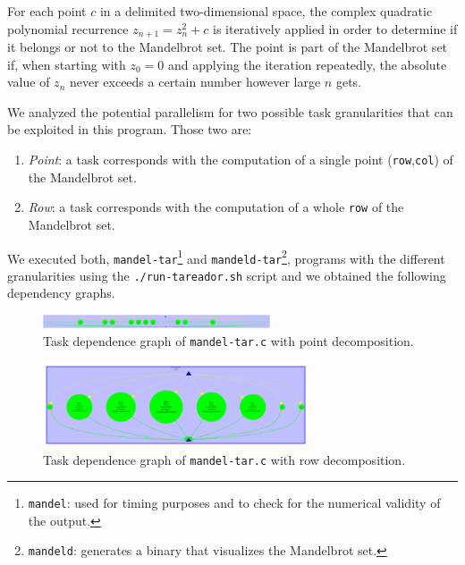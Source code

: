 For each point $c$ in a delimited two-dimensional space, the complex quadratic polynomial recurrence $z_{n+1} = z^2_n + c$ is iteratively applied in order to determine if it belongs or not to the Mandelbrot set.  The point is part of the Mandelbrot set if, when starting with $z_0 = 0$ and applying the iteration repeatedly, the absolute value of $z_n$ never exceeds a certain number however large $n$ gets.

We analyzed the potential parallelism for two possible task granularities that can be exploited in this program. Those two are:
\begin{enumerate}[label=\alph*)]
\item \emph{Point}: a task corresponds with the computation of a single point (\texttt{row},\texttt{col}) of the Mandelbrot set.
\item \emph{Row}: a task corresponds with the computation of a whole \texttt{row} of the Mandelbrot set.
\end{enumerate}

We executed both, \texttt{mandel-tar}\footnote{\texttt{mandel}: used for timing purposes and to check for the numerical validity of the output.} and \texttt{mandeld-tar}\footnote{\texttt{mandeld}: generates a binary that visualizes the Mandelbrot set.}, programs with the different granularities using the \texttt{./run-tareador.sh} script and we obtained the following dependency graphs.

\begin{figure}[H]
\centering
\includegraphics[width=0.6\textwidth]{plots/dependency_graph_mandel_point.png}
\caption{Task dependence graph of \texttt{mandel-tar.c} with point decomposition.}
\label{graph:mandel_point}
\end{figure}

\begin{figure}[H]
\centering
\includegraphics[width=0.7\textwidth]{plots/dependency_graph_mandel_row.png}
\caption{Task dependence graph of \texttt{mandel-tar.c} with row decomposition.}
\label{graph:mandel_row}
\end{figure}

